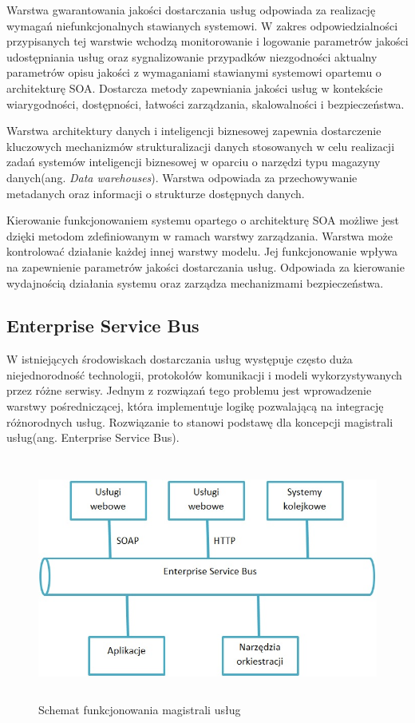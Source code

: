 			Warstwa gwarantowania jakości dostarczania usług odpowiada za realizację wymagań niefunkcjonalnych stawianych systemowi. W zakres odpowiedzialności przypisanych tej warstwie wchodzą monitorowanie i logowanie parametrów jakości udostępniania usług oraz sygnalizowanie przypadków niezgodności aktualny parametrów opisu jakości z wymaganiami stawianymi systemowi opartemu o architekturę SOA. Dostarcza metody zapewniania jakości usług w kontekście wiarygodności, dostępności, łatwości zarządzania, skalowalności i bezpieczeństwa. 

			Warstwa architektury danych i inteligencji biznesowej zapewnia dostarczenie kluczowych mechanizmów strukturalizacji danych stosowanych w celu realizacji zadań systemów inteligencji biznesowej w oparciu o narzędzi typu magazyny danych(ang. \textit{Data warehouses}). Warstwa odpowiada za przechowywanie metadanych oraz informacji o strukturze dostępnych danych. 

			Kierowanie funkcjonowaniem systemu opartego o architekturę SOA możliwe jest dzięki metodom zdefiniowanym w ramach warstwy zarządzania. Warstwa może kontrolować działanie każdej innej warstwy modelu. Jej funkcjonowanie wpływa na zapewnienie parametrów jakości dostarczania usług. Odpowiada za kierowanie wydajnością działania systemu oraz zarządza mechanizmami bezpieczeństwa. 

	\subsection{Enterprise Service Bus} 

		W istniejących środowiskach dostarczania usług występuje często duża niejednorodność technologii, protokołów komunikacji i modeli wykorzystywanych przez różne serwisy. Jednym z rozwiązań tego problemu jest wprowadzenie warstwy pośredniczącej, która implementuje logikę pozwalającą na integrację różnorodnych usług. Rozwiązanie to stanowi podstawę dla koncepcji magistrali usług(ang. Enterprise Service Bus). 

		\begin{figure}[h]
			\centering
			\includegraphics[width=15cm,height=8cm]{img/esb.jpg}
			\caption{Schemat funkcjonowania magistrali usług}
			\label{Schemat funkcjonowania magistrali uslug}
		\end{figure}

